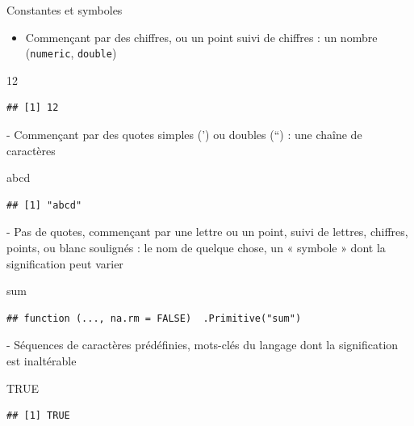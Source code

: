 \documentclass[
  ignorenonframetext,
]{beamer}
\newenvironment{Shaded}{\begin{snugshade}}{\end{snugshade}}
\newcommand{\ConstantTok}[1]{\textcolor[rgb]{0.56,0.35,0.01}{#1}}
\newcommand{\DecValTok}[1]{\textcolor[rgb]{0.00,0.00,0.81}{#1}}
\newcommand{\NormalTok}[1]{#1}
\newcommand{\StringTok}[1]{\textcolor[rgb]{0.31,0.60,0.02}{#1}}
\providecommand{\tightlist}{%
  \setlength{\itemsep}{0pt}\setlength{\parskip}{0pt}}
\begin{document}
\begin{frame}[fragile]{Constantes et symboles}
\protect\hypertarget{constantes-et-symboles}{}
\begin{itemize}
\tightlist
\item
  Commençant par des chiffres, ou un point suivi de chiffres : un nombre
  (\texttt{numeric}, \texttt{double})
\end{itemize}

\tiny

\begin{Shaded}
\begin{Highlighting}[]
\DecValTok{12}
\end{Highlighting}
\end{Shaded}

\begin{verbatim}
## [1] 12
\end{verbatim}

\normalsize - Commençant par des quotes simples (') ou doubles (``) :
une chaîne de caractères

\tiny

\begin{Shaded}
\begin{Highlighting}[]
\StringTok{\textquotesingle{}abcd\textquotesingle{}}
\end{Highlighting}
\end{Shaded}

\begin{verbatim}
## [1] "abcd"
\end{verbatim}

\normalsize - Pas de quotes, commençant par une lettre ou un point,
suivi de lettres, chiffres, points, ou blanc soulignés : le nom de
quelque chose, un « symbole » dont la signification peut varier

\tiny

\begin{Shaded}
\begin{Highlighting}[]
\NormalTok{sum}
\end{Highlighting}
\end{Shaded}

\begin{verbatim}
## function (..., na.rm = FALSE)  .Primitive("sum")
\end{verbatim}

\normalsize - Séquences de caractères prédéfinies, mots-clés du langage
dont la signification est inaltérable

\tiny

\begin{Shaded}
\begin{Highlighting}[]
\ConstantTok{TRUE}
\end{Highlighting}
\end{Shaded}

\begin{verbatim}
## [1] TRUE
\end{verbatim}

\normalsize
\end{frame}
\end{document}
